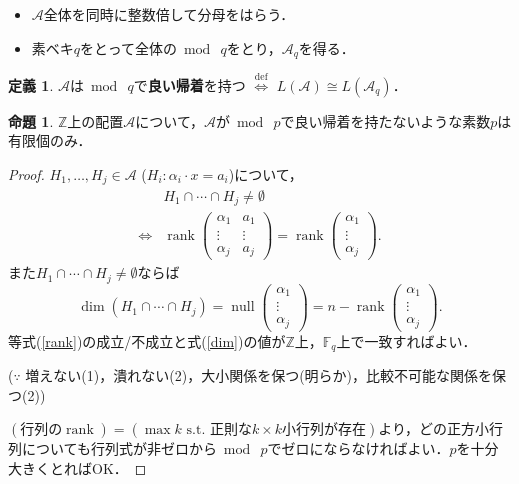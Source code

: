 \documentclass[xelatex,ja=standard,a4paper,14pt,everyparhook=compat]{bxjsarticle}
\newcommand{\bbZ}{\mathbb{Z}}
\newcommand{\bbF}{\mathbb{F}}
\newcommand{\mcA}{\mathcal{A}}
\newcommand{\umod}{{\bmod\:}}
\DeclareMathOperator{\rank}{rank}
\DeclareMathOperator{\nullity}{null}
\theoremstyle{definition}
\newtheorem*{definition}{定義}
\newtheorem*{proposition}{命題}
\begin{document}
\begin{itemize}
    \item $\mcA$全体を同時に整数倍して分母をはらう．
    \item 素ベキ$q$をとって全体の$\umod q$をとり，$\mcA_q$を得る．
\end{itemize}

\begin{definition}
    $\mcA$は$\umod q$で\textbf{良い帰着}を持つ $\overset{\mathrm{def}}{\iff}$ $L(\mcA) \cong L(\mcA_q)$．
\end{definition}

\begin{proposition}
    $\bbZ$上の配置$\mcA$について，$\mcA$が$\umod p$で良い帰着を持たないような素数$p$は有限個のみ．
\end{proposition}
\begin{proof}
    $H_1,\ldots,H_j \in \mcA$ ($H_i : \alpha_i \cdot x = a_i$)について， \begin{align} \label{rank}
               & H_1 \cap \cdots \cap H_j \neq \emptyset \nonumber                   \\
        \iff{} & \rank\begin{pmatrix}
            \alpha_1 & a_1    \\
            \vdots   & \vdots \\
            \alpha_j & a_j
        \end{pmatrix} = \rank \begin{pmatrix}
            \alpha_1 \\
            \vdots   \\
            \alpha_j
        \end{pmatrix}.
    \end{align}
    また$H_1 \cap \cdots \cap H_j \neq \emptyset$ならば \begin{equation} \label{dim}
        \dim(H_1 \cap \cdots \cap H_j) = \nullity \begin{pmatrix}
            \alpha_1 \\
            \vdots   \\
            \alpha_j
        \end{pmatrix} = n - \rank \begin{pmatrix}
            \alpha_1 \\
            \vdots   \\
            \alpha_j
        \end{pmatrix}.
    \end{equation}
    等式(\ref{rank})の成立/不成立と式(\ref{dim})の値が$\bbZ$上，$\bbF_q$上で一致すればよい．

    ($\because$ 増えない(1)，潰れない(2)，大小関係を保つ(明らか)，比較不可能な関係を保つ(2))

    $(\text{行列の$\rank$}) = (\text{$\max k$ s.t. 正則な$k \times k$小行列が存在})$より，どの正方小行列についても行列式が非ゼロから$\umod p$でゼロにならなければよい．$p$を十分大きくとればOK．
\end{proof}
\end{document}
